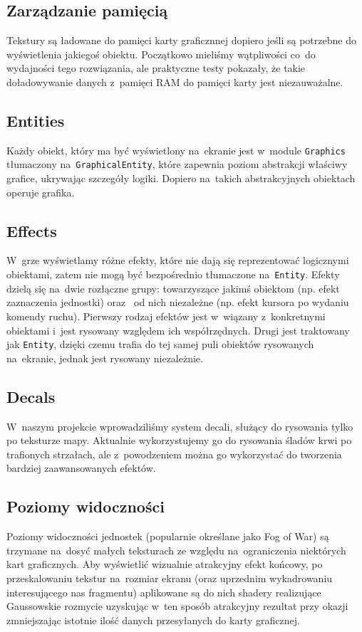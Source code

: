 \documentclass[licencjacka]{pracamgr}
\begin{document}
    \subsection{Zarządzanie pamięcią}
      Tekstury są ładowane do pamięci karty graficznnej dopiero jeśli są potrzebne do wyświetlenia jakiegoś
      obiektu. Początkowo mieliśmy wątpliwości co~do wydajności tego rozwiązania, ale praktyczne testy pokazały, że
      takie doładowywanie danych z~pamięci RAM do pamięci karty jest niezauważalne.

    \subsection{Entities}
      Każdy obiekt, który ma być wyświetlony na~ekranie jest w~module \texttt{Graphics} tłumaczony na~\texttt{GraphicalEntity}, które
      zapewnia poziom abstrakcji właściwy grafice, ukrywając szczegóły logiki. Dopiero na~takich abstrakcyjnych obiektach operuje grafika.

    \subsection{Effects}
      W~grze wyświetlamy różne efekty, które nie dają się reprezentować logicznymi obiektami, zatem nie mogą być bezpośrednio tłumaczone
      na~\texttt{Entity}. Efekty dzielą się na~dwie rozłączne grupy: towarzyszące jakimś obiektom (np. efekt zaznaczenia jednostki) oraz~
      od nich niezależne (np. efekt kursora po wydaniu komendy ruchu). Pierwszy rodzaj efektów jest w~wiązany z~konkretnymi obiektami i~jest
      rysowany względem ich współrzędnych. Drugi jest traktowany jak \texttt{Entity}, dzięki czemu trafia do tej samej puli obiektów rysowanych
      na~ekranie, jednak jest rysowany niezależnie.

    \subsection{Decals}
      W~naszym projekcie wprowadziliśmy system decali, służący do rysowania tylko po teksturze mapy. Aktualnie wykorzystujemy go do
      rysowania śladów krwi po trafionych strzałach, ale z~powodzeniem można go wykorzystać do tworzenia bardziej zaawansowanych efektów.

    \subsection{Poziomy widoczności}
      Poziomy widoczności jednostek (popularnie określane jako Fog of War) są trzymane na~dosyć małych teksturach ze względu na~ograniczenia
      niektórych kart graficznych. Aby wyświetlić wizualnie atrakcyjny efekt końcowy, po przeskalowaniu tekstur na~rozmiar ekranu
      (oraz uprzednim wykadrowaniu interesującego nas fragmentu) aplikowane są do nich shadery realizujące Gaussowskie rozmycie\cite{GB}
      uzyskując w~ten sposób atrakcyjny rezultat przy okazji zmniejszając istotnie ilość danych przesyłanych do karty graficznej.
\end{document}
